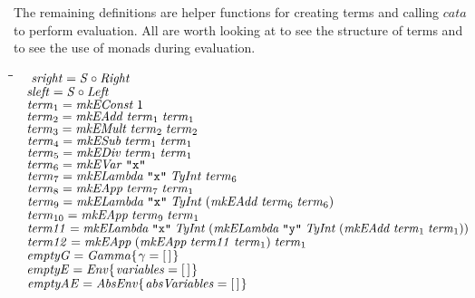 \documentclass[10pt]{article}
\newlength{\lwidth}\setlength{\lwidth}{4.5cm}
\newlength{\cwidth}\setlength{\cwidth}{8mm} %
\newcommand{\Conid}[1]{\mathit{#1}}
\newcommand{\Varid}[1]{\mathit{#1}}
\begin{document}
The remaining definitions are helper functions for creating terms and
calling \ensuremath{\Varid{cata}} to perform evaluation.  All are worth looking at to see
the structure of terms and to see the use of monads during evaluation.

\begin{tabbing}
\qquad\=\hspace{\lwidth}\=\hspace{\cwidth}\=\+\kill
${\hskip1.00em\relax\Varid{sright}\mathrel{=}\Conid{S}\mathbin{\circ}\Conid{Right}}$\\
${}$\\
${\hskip1.00em\relax\Varid{sleft}\mathrel{=}\Conid{S}\mathbin{\circ}\Conid{Left}}$\\
${}$\\
${\hskip1.00em\relax\Varid{term}_1\mathrel{=}\Varid{mkEConst}\;\mathrm{1}}$\\
${\hskip1.00em\relax\Varid{term}_2\mathrel{=}\Varid{mkEAdd}\;\Varid{term}_1\;\Varid{term}_1}$\\
${\hskip1.00em\relax\Varid{term}_3\mathrel{=}\Varid{mkEMult}\;\Varid{term}_2\;\Varid{term}_2}$\\
${\hskip1.00em\relax\Varid{term}_4\mathrel{=}\Varid{mkESub}\;\Varid{term}_1\;\Varid{term}_1}$\\
${\hskip1.00em\relax\Varid{term}_5\mathrel{=}\Varid{mkEDiv}\;\Varid{term}_1\;\Varid{term}_1}$\\
${\hskip1.00em\relax\Varid{term}_6\mathrel{=}\Varid{mkEVar}\;\text{\tt \char34 x\char34}}$\\
${\hskip1.00em\relax\Varid{term}_7\mathrel{=}\Varid{mkELambda}\;\text{\tt \char34 x\char34}\;\Conid{TyInt}\;\Varid{term}_6}$\\
${\hskip1.00em\relax\Varid{term}_8\mathrel{=}\Varid{mkEApp}\;\Varid{term}_7\;\Varid{term}_1}$\\
${\hskip1.00em\relax\Varid{term}_9\mathrel{=}\Varid{mkELambda}\;\text{\tt \char34 x\char34}\;\Conid{TyInt}\;(\Varid{mkEAdd}\;\Varid{term}_6\;\Varid{term}_6)}$\\
${\hskip1.00em\relax\Varid{term}_{10}\mathrel{=}\Varid{mkEApp}\;\Varid{term}_9\;\Varid{term}_1}$\\
${\hskip1.00em\relax\Varid{term11}\mathrel{=}\Varid{mkELambda}\;\text{\tt \char34 x\char34}\;\Conid{TyInt}\;(\Varid{mkELambda}\;\text{\tt \char34 y\char34}\;\Conid{TyInt}\;(\Varid{mkEAdd}\;\Varid{term}_1\;\Varid{term}_1))}$\\
${\hskip1.00em\relax\Varid{term12}\mathrel{=}\Varid{mkEApp}\;(\Varid{mkEApp}\;\Varid{term11}\;\Varid{term}_1)\;\Varid{term}_1}$\\
${}$\\
${\hskip1.00em\relax\Varid{emptyG}\mathrel{=}\Conid{Gamma}\{\mskip1.5mu \Varid{\gamma}\mathrel{=}[\mskip1.5mu \mskip1.5mu]\mskip1.5mu\}}$\\
${\hskip1.00em\relax\Varid{emptyE}\mathrel{=}\Conid{Env}\{\mskip1.5mu \Varid{variables}\mathrel{=}[\mskip1.5mu \mskip1.5mu]\mskip1.5mu\}}$\\
${\hskip1.00em\relax\Varid{emptyAE}\mathrel{=}\Conid{AbsEnv}\{\mskip1.5mu \Varid{absVariables}\mathrel{=}[\mskip1.5mu \mskip1.5mu]\mskip1.5mu\}}$
\end{tabbing}
\end{document}
